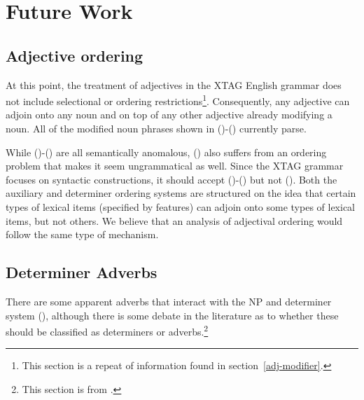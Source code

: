 \appendix
\chapter{Future Work}
\label{future-work}

\section{Adjective ordering}

At this point, the treatment of adjectives in the XTAG English grammar does not
include selectional or ordering restrictions\footnote{This section is a repeat
of information found in section~\ref{adj-modifier}.}. Consequently, any
adjective can adjoin onto any noun and on top of any other adjective already
modifying a noun. All of the modified noun phrases shown in ()-()
currently parse.


While ()-() are all semantically anomalous, () also suffers
from an ordering problem that makes it seem ungrammatical as well.  Since the
XTAG grammar focuses on syntactic constructions, it should accept
()-() but not ().  Both the auxiliary and determiner
ordering systems are structured on the idea that certain types of lexical items
(specified by features) can adjoin onto some types of lexical items, but not
others.  We believe that an analysis of adjectival ordering would follow the
same type of mechanism.



\section{Determiner Adverbs}

There are some apparent adverbs that interact with the NP and determiner system
(\cite{quirk85}), although there is some debate in the literature as to whether
these should be classified as determiners or adverbs.\footnote{This section is
from \cite{HockeyEgedi94}.}



